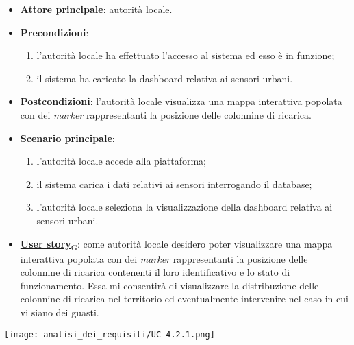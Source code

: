 \begin{itemize}
	\item \textbf{Attore principale}: autorità locale.
	\item \textbf{Precondizioni}:
	      \begin{enumerate}
		      \item l'autorità locale ha effettuato l'accesso al sistema ed esso è in funzione;
		      \item il sistema ha caricato la dashboard relativa ai sensori urbani.
	      \end{enumerate}
	\item \textbf{Postcondizioni}: l'autorità locale visualizza una mappa interattiva popolata con dei \textit{marker} rappresentanti la posizione delle colonnine di ricarica.
	\item \textbf{Scenario principale}:
	      \begin{enumerate}
		      \item l'autorità locale accede alla piattaforma;
		      \item il sistema carica i dati relativi ai sensori interrogando il database;
		      \item l'autorità locale seleziona la visualizzazione della dashboard relativa ai sensori urbani.
	      \end{enumerate}
	\item \href{https://7last.github.io/docs/pb/documentazione-interna/glossario\#user-story}{\textbf{User story}\textsubscript{G}}:
	      come autorità locale desidero poter visualizzare una mappa interattiva popolata con dei \textit{marker} rappresentanti la posizione delle colonnine di ricarica
	      contenenti il loro identificativo e lo stato di funzionamento. Essa mi consentirà di visualizzare la distribuzione delle colonnine di ricarica nel territorio
	      ed eventualmente intervenire nel caso in cui vi siano dei guasti.
\end{itemize}
\begin{center}
	\texttt{[image: analisi\_dei\_requisiti/UC-4.2.1.png]}
\end{center}


